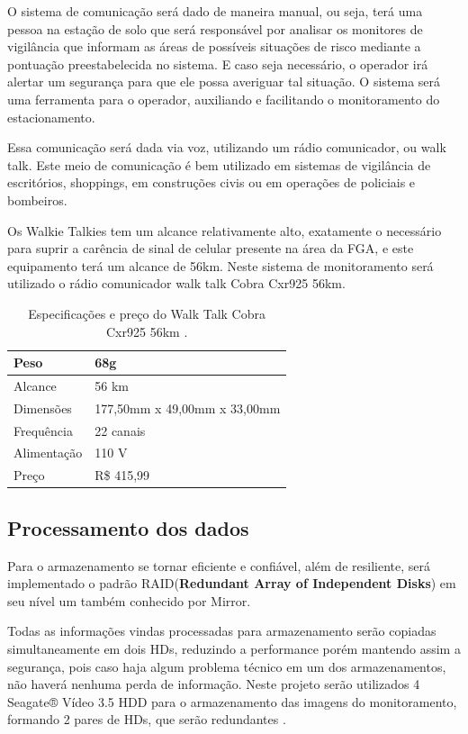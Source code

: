 O sistema de comunicação será dado de maneira manual, ou seja, terá uma pessoa na estação
de solo que será responsável por analisar os monitores de vigilância que  informam as áreas de possíveis situações de risco mediante a pontuação preestabelecida no sistema. E caso seja necessário, o operador irá alertar um segurança para que ele possa averiguar tal situação. O sistema será uma ferramenta para o operador, auxiliando e facilitando o monitoramento do estacionamento.

Essa comunicação será dada via voz, utilizando um rádio comunicador, ou walk talk. Este meio
de comunicação é bem utilizado em sistemas de vigilância de escritórios, shoppings, em
 construções civis ou em operações de policiais e bombeiros.

Os Walkie Talkies tem um alcance relativamente alto, exatamente o necessário para suprir a
carência de sinal de celular presente na área da FGA, e este equipamento terá um alcance de
 56km. Neste sistema de monitoramento será utilizado o rádio comunicador walk talk Cobra
Cxr925 56km.

\begin{table}[H]
\centering
\begin{tabular}{|l|l|}
\hline
Peso        & 68g                          \\ \hline
Alcance     & 56 km                        \\ \hline
Dimensões   & 177,50mm x 49,00mm x 33,00mm \\ \hline
Frequência  & 22 canais                    \\ \hline
Alimentação & 110 V                        \\ \hline
Preço       & R\$ 415,99                   \\ \hline
\end{tabular}
\caption{Especificações e preço do Walk Talk Cobra Cxr925 56km \cite{walk}.}
\label{table:walk}
\end{table}

\subsection{Processamento dos dados}

Para o armazenamento se tornar eficiente e confiável, além de resiliente, será implementado o
padrão RAID(\textbf{Redundant Array of Independent Disks}) em seu nível um também conhecido por
Mirror.

Todas as informações vindas processadas para armazenamento serão copiadas
simultaneamente em dois HDs, reduzindo a performance porém mantendo assim a segurança,
pois caso haja algum problema técnico em um dos armazenamentos, não haverá nenhuma
perda de informação. Neste projeto serão utilizados 4 Seagate® Vídeo 3.5 HDD para o
armazenamento das imagens do monitoramento, formando 2 pares de HDs, que serão
redundantes \cite{raid}.


